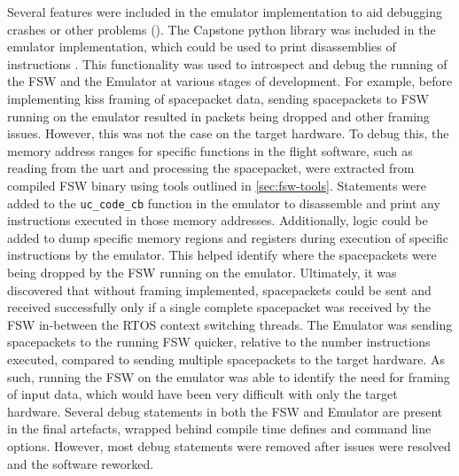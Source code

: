 \documentclass[../report.tex]{subfiles}
\begin{document}
Several features were included in the emulator implementation to aid debugging
crashes or other problems (). The Capstone python library was
included in the emulator implementation, which could be used to print
disassemblies of instructions \citep{Capstone}. This functionality was used to
introspect and debug the running of the FSW and the Emulator at various stages
of development. For example, before implementing kiss framing of spacepacket
data, sending spacepackets to FSW running on the emulator resulted in packets
being dropped and other framing issues. However, this was not the case on the
target hardware. To debug this, the memory address ranges for specific
functions in the flight software, such as reading from the uart and processing
the spacepacket, were extracted from compiled FSW binary using tools outlined
in \autoref{sec:fsw-tools}. Statements were added to the
\lstinline|uc_code_cb| function in the emulator to disassemble and print any
instructions executed in those memory addresses. Additionally, logic could be
added to dump specific memory regions and registers during execution of
specific instructions by the emulator. This helped identify where the
spacepackets were being dropped by the FSW running on the emulator. Ultimately,
it was discovered that without framing implemented, spacepackets could be sent
and received successfully only if a single complete spacepacket was received by
the FSW in-between the RTOS context switching threads. The Emulator was sending
spacepackets to the running FSW quicker, relative to the number instructions
executed, compared to sending multiple spacepackets to the target hardware. As
such, running the FSW on the emulator was able to identify the need for framing
of input data, which would have been very difficult with only the target
hardware. Several debug statements in both the FSW and Emulator are present in
the final artefacts, wrapped behind compile time defines and command line
options. However, most debug statements were removed after issues were resolved
and the software reworked.

\end{document}
